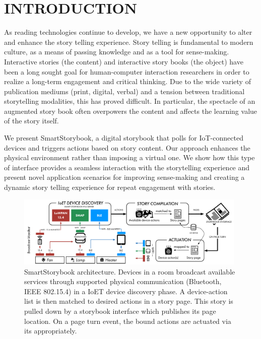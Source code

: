 \documentclass{sigchi}
\newcommand\name{SmartStorybook}
\newcommand\namesp{SmartStorybook }
\begin{document}




\newpage
\section{INTRODUCTION}
As reading technologies continue to develop, we have a new opportunity to alter and enhance the story telling experience. Story telling is fundamental to modern culture, as a means of passing knowledge and as a tool for sense-making. Interactive stories (the content) and interactive story books (the object) have been a long sought goal for human-computer interaction researchers in order to realize a long-term engagement and critical thinking. Due to the wide variety of publication mediums (print, digital, verbal) and a tension between traditional storytelling modalities, this has proved difficult. In particular, the spectacle of an augmented story book often overpowers the content and affects the learning value of the story itself. 

We present \name, a digital storybook that polls for IoT-connected devices and triggers actions based on story content. Our approach enhances the physical environment rather than imposing a virtual one. We show how this type of interface provides a seamless interaction with the storytelling experience and present novel application scenarios for improving sense-making and creating a dynamic story telling experience for repeat engagement with stories. 
   


  \begin{figure}[th!]
      \centering
      \includegraphics[keepaspectratio, width=0.98\textwidth]{figures/architecture.pdf} 
      \caption{\namesp architecture. Devices in a room broadcast available services through supported physical communication (Bluetooth, IEEE 802.15.4) in a IoET device discovery phase. A device-action list is then matched to desired actions in a story page. This story is pulled down by a storybook interface which publishes its page location. On a page turn event, the bound actions are actuated via its appropriately. }
      \vspace{-4pt}
      \label{fig:architecture} 
    \end{figure}
\end{document}
